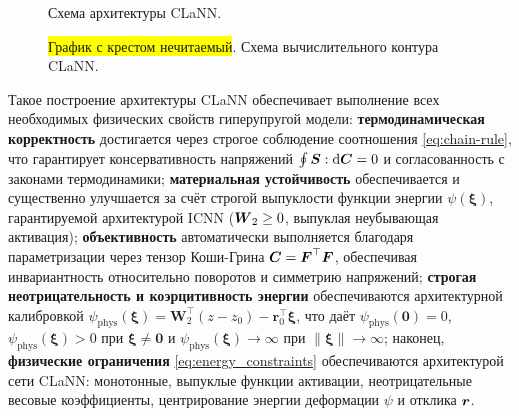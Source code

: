 \begin{figure}[H]
  \centering
  \resizebox{\textwidth}{!}{}
  \caption{Схема архитектуры CLaNN.}
  \label{fig:clann_arc}
  \label{fig:clann_icnn1_nn}
\end{figure}

\begin{figure}[H]
  \centering
  \resizebox{\textwidth}{!}{}
  \caption{\colorbox{yellow}{График с крестом нечитаемый}. Схема вычислительного контура CLaNN.}
  \label{fig:clann_pipeline}
\end{figure}

Такое построение архитектуры CLaNN обеспечивает выполнение всех необходимых физических свойств гиперупругой модели: 
\textbf{термодинамическая корректность} достигается через строгое соблюдение соотношения \eqref{eq:chain-rule}, 
что гарантирует консервативность напряжений $\oint \boldsymbol{S}:\mathrm{d}\boldsymbol{C} = 0$ и согласованность с законами 
термодинамики; 
\textbf{материальная устойчивость} обеспечивается и существенно улучшается за счёт строгой выпуклости функции энергии 
$\psi(\boldsymbol{\xi})$, гарантируемой архитектурой ICNN ($\boldsymbol{W}_2 \ge 0$, выпуклая неубывающая активация); 
\textbf{объективность} автоматически выполняется благодаря параметризации через тензор 
Коши-Грина $\boldsymbol{C} = \boldsymbol{F}^{\top}\boldsymbol{F}$, обеспечивая инвариантность относительно поворотов и симметрию напряжений; 
\textbf{строгая неотрицательность и коэрцитивность энергии} обеспечиваются архитектурной калибровкой 
$\psi_{\mathrm{phys}}(\boldsymbol{\xi}) = \mathbf{W}_2^{\top}(z - z_0) - \mathbf{r}_0^{\top}\boldsymbol{\xi}$,
что даёт $\psi_{\mathrm{phys}}(\mathbf{0})=0$, $\psi_{\mathrm{phys}}(\boldsymbol{\xi})>0$ при $\boldsymbol{\xi}\ne\mathbf{0}$ и 
$\psi_{\mathrm{phys}}(\boldsymbol{\xi})\to\infty$ при $\|\boldsymbol{\xi}\|\to\infty$; 
наконец, \textbf{физические ограничения} \eqref{eq:energy_constraints} обеспечиваются архитектурой сети CLaNN: монотонные, выпуклые функции активации,
неотрицательные весовые коэффициенты, центрирование энергии деформации $\psi$ и отклика $\boldsymbol{r}$.



